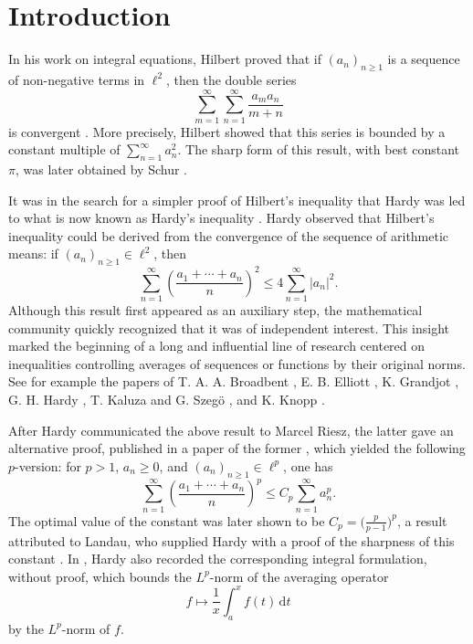 \documentclass[oneside,10pt]{article}          %
\numberwithin{equation}{section}
\begin{document}
\section{Introduction}

In his work on integral equations, Hilbert proved that if $(a_n)_{n \geq 1}$ is a sequence of non-negative terms in $\ell^2$, then the double series
\[
\sum_{m=1}^{\infty}\sum_{n=1}^{\infty}
    \frac{a_m a_n}{m+n}
\]
is convergent \cite{Hilbert1906}. More precisely, Hilbert showed that this series is bounded by a constant multiple of $\sum_{n=1}^{\infty} a_n^2$. The sharp form of this result, with best constant $\pi$, was later obtained by Schur \cite{Schur1911}.

It was in the search for a simpler proof of Hilbert's inequality that Hardy was led to what is now known as Hardy's inequality \cite{hardy1919notes}. Hardy observed that Hilbert's inequality could be derived from the convergence of the sequence of arithmetic means: if $(a_n)_{n \geq 1} \in \ell^2$, then
\[
\sum_{n=1}^{\infty} \left( \frac{a_1+\cdots+a_n}{n} \right)^{\!2} \leq 4\sum_{n=1}^{\infty} |a_n|^2.
\]
Although this result first appeared as an auxiliary step, the mathematical community quickly recognized that it was of independent interest. This insight marked the beginning of a long and influential line of research centered on inequalities controlling averages of sequences or functions by their original norms. See for example the papers of T. A. A. Broadbent \cite{MR1574000}, E. B. Elliott \cite{MR1574962}, K. Grandjot \cite{MR1574375}, G. H. Hardy \cite{hardy1925notes}, T. Kaluza and G. Szeg\"{o} \cite{MR1574830}, and K. Knopp \cite{MR1574165}.

After Hardy communicated the above result to Marcel Riesz, the latter gave an alternative proof, published in a paper of the former \cite{MR1544414}, which yielded the following $p$-version: for $p>1$, $a_n \geq 0$, and $(a_n)_{n \geq 1} \in \ell^p$, one has
\[
\sum_{n=1}^{\infty} \left( \frac{a_1+\cdots+a_n}{n} \right)^p \leq C_p \sum_{n=1}^{\infty} a_n^p .
\]
The optimal value of the constant was later shown to be $C_p = \big( \frac{p}{p-1} \big)^p$, a result attributed to Landau, who supplied Hardy with a proof of the sharpness of this constant \cite{MR1575105}. In \cite{MR1544414}, Hardy also recorded the corresponding integral formulation, without proof, which bounds the $L^p$-norm of the averaging operator
\[
f \mapsto \frac{1}{x}\int_a^x f(t)\,\mathrm{d}t
\]
by the $L^p$-norm of $f$.
\end{document}

